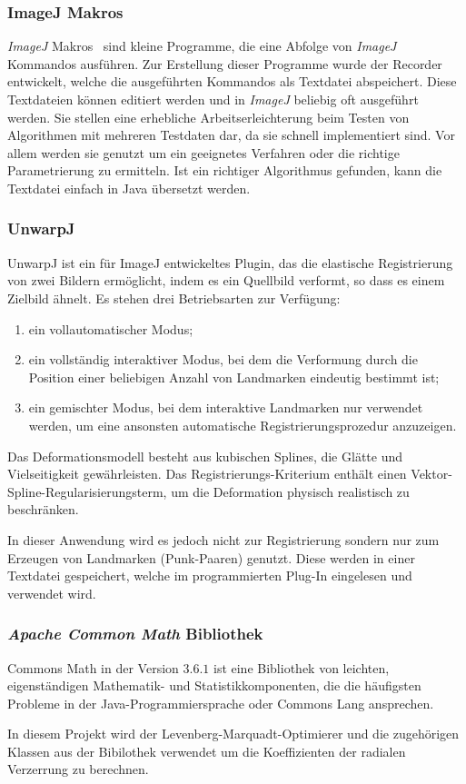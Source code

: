 \subsubsection{ImageJ Makros}	
\textit{ImageJ} Makros~\cite{JMacros} sind kleine Programme, die eine Abfolge von \textit{ImageJ} Kommandos ausführen. Zur Erstellung dieser Programme wurde der Recorder entwickelt, welche die ausgeführten Kommandos als Textdatei abspeichert. Diese Textdateien können editiert werden und in \textit{ImageJ} beliebig oft ausgeführt werden. Sie stellen eine erhebliche Arbeitserleichterung beim Testen von Algorithmen mit mehreren Testdaten dar, da sie schnell implementiert sind. Vor allem werden sie genutzt um ein geeignetes Verfahren oder die richtige Parametrierung zu ermitteln. Ist ein richtiger Algorithmus gefunden, kann die Textdatei einfach in Java übersetzt werden.


\subsubsection{UnwarpJ}

UnwarpJ ist ein für ImageJ entwickeltes Plugin, das die elastische Registrierung von zwei Bildern ermöglicht, indem es ein Quellbild verformt, so dass es einem Zielbild ähnelt. 
Es stehen drei Betriebsarten zur Verfügung: 

\begin{enumerate}
\item ein vollautomatischer Modus; 
\item ein vollständig interaktiver Modus, bei dem die Verformung durch die Position einer beliebigen Anzahl von Landmarken eindeutig bestimmt ist; 
\item ein gemischter Modus, bei dem interaktive Landmarken nur verwendet werden, um eine ansonsten automatische Registrierungsprozedur anzuzeigen.
\end{enumerate}

Das Deformationsmodell besteht aus kubischen Splines, die Glätte und Vielseitigkeit gewährleisten. Das Registrierungs-Kriterium enthält einen Vektor-Spline-Regularisierungsterm, um die Deformation physisch realistisch zu beschränken.\cite{unwrapj}

In dieser Anwendung wird es jedoch nicht zur Registrierung sondern nur zum Erzeugen von Landmarken (Punk-Paaren) genutzt. Diese werden in einer Textdatei gespeichert, welche im programmierten Plug-In eingelesen und verwendet wird.

\subsubsection{\textit{Apache Common Math} Bibliothek}

Commons Math in der Version $3.6.1$ ist eine Bibliothek von leichten, eigenständigen Mathematik- und Statistikkomponenten, die die häufigsten Probleme in der Java-Programmiersprache oder Commons Lang ansprechen.
\cite{appache}

In diesem Projekt wird der Levenberg-Marquadt-Optimierer und die zugehörigen Klassen aus der Bibilothek verwendet um die Koeffizienten der radialen Verzerrung zu berechnen.
